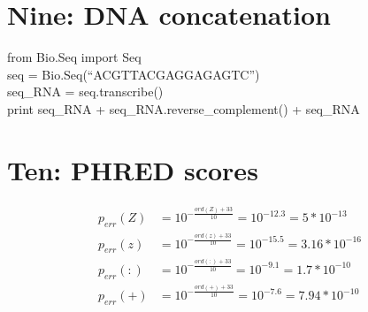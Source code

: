 \documentclass[10pt]{article} %
\begin{document}
\section{Nine: DNA concatenation}
from Bio.Seq import Seq\\
seq = Bio.Seq(``ACGTTACGAGGAGAGTC'')\\
seq\_RNA = seq.transcribe()\\
print seq\_RNA + seq\_RNA.reverse\_complement() + seq\_RNA\\

\section{Ten: PHRED scores}

\begin{align*}
  p_{err}(Z) &= 10^{-\frac{ord(Z)+33}{10}} = 10^{-12.3} = 5*10^{-13}\\
  p_{err}(z) &= 10^{-\frac{ord(z)+33}{10}} = 10^{-15.5} = 3.16*10^{-16}\\
  p_{err}(:) &= 10^{-\frac{ord(:)+33}{10}} = 10^{-9.1} = 1.7*10^{-10}\\
  p_{err}(+) &= 10^{-\frac{ord(+)+33}{10}} = 10^{-7.6} = 7.94*10^{-10}\\
\end{align*}
\end{document}
